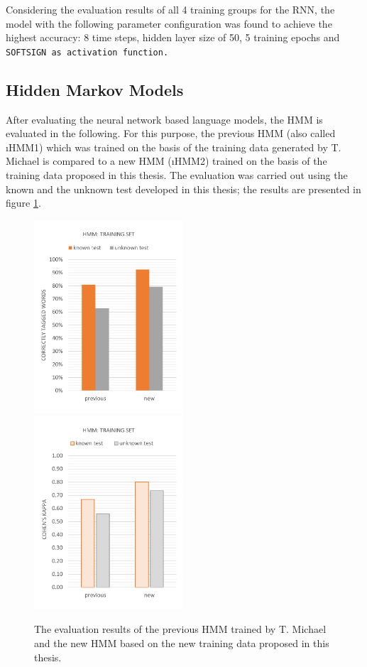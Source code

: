 Considering the evaluation results of all 4 training groups for the RNN, the model with the following parameter configuration was found to achieve the highest accuracy: 8 time steps, hidden layer size of 50, 5 training epochs and \tt{SOFTSIGN} as activation function.

\subsection{Hidden Markov Models}\label{c.evaluation.results.hmm}
After evaluating the neural network based language models, the HMM is evaluated in the following. For this purpose, the previous HMM (also called \i{HMM1}) which was trained on the basis of the training data generated by T. Michael \cite{michael2016} is compared to a new HMM (\i{HMM2}) trained on the basis of the training data proposed in this thesis. The evaluation was carried out using the known and the unknown test developed in this thesis; the results are presented in figure \ref{f.evaluation.hmm}.

\begin{figure}[H]
\centering
{}
{\includegraphics[width=0.495\textwidth]{images/evaluation_hmm}}
{\includegraphics[width=0.495\textwidth]{images/evaluation_hmm_k}}
\vspace{1em}
\caption[HMM Evaluation]{The evaluation results of the previous HMM trained by T. Michael \cite{michael2016} and the new HMM based on the new training data proposed in this thesis.}
\label{f.evaluation.hmm}
\end{figure}


